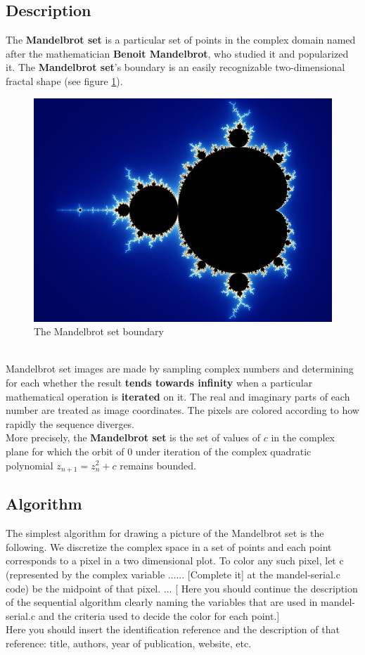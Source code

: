 \documentclass[a4paper,11pt]{article}
\begin{document}
\subsection{Description}
The \textbf{Mandelbrot set} is a particular set of points in the complex domain named after the mathematician
    \textbf{Benoit Mandelbrot}, who studied it and popularized it. The \textbf{Mandelbrot set}'s boundary is an easily
    recognizable two-dimensional fractal shape (see figure \ref{mandelbrot:boundary}).
\begin{figure}[h!]
\includegraphics[width=1.0\textwidth]{figures/mandelbrot_boundary.jpg}
\caption{The Mandelbrot set boundary}
\label{mandelbrot:boundary}
\end{figure}
\\
Mandelbrot set images are made by sampling complex numbers and determining for each whether the result
    \textbf{tends towards infinity} when a particular mathematical operation is \textbf{iterated} on it. The real
    and imaginary parts of each number are treated as image coordinates. The pixels are colored according to how rapidly
    the sequence diverges.
\\
More precisely, the \textbf{Mandelbrot set} is the set of values of $c$ in the complex plane for which the orbit of
    $0$ under iteration of the complex quadratic polynomial $z_{n+1} = z^2_n + c$ remains bounded.
\subsection{Algorithm}
The simplest algorithm for drawing a picture of the Mandelbrot set is the following. We discretize the
    complex space in a set of points and each point corresponds to a pixel in a two dimensional plot. To color
    any such pixel, let c (represented by the complex variable ...... [Complete it] at the mandel-serial.c
    code) be the midpoint of that pixel. ... [ Here you should continue the description of the sequential
    algorithm clearly naming the variables that are used in mandel-serial.c and the criteria used to decide
    the color for each point.]
\\
Here you should insert the identification reference and the description of that reference: title,
    authors, year of publication, website, etc.
\end{document}
